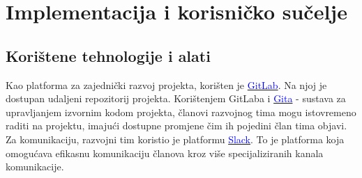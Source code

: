 \chapter{Implementacija i korisničko sučelje} \label{implementacija}
		
		
		\section{Korištene tehnologije i alati}
		
			 
			
        \par{
            Kao platforma za zajednički razvoj projekta, korišten je \href{https://gitlab.com/}{\textcolor{blue}{GitLab}}. Na njoj je dostupan udaljeni repozitorij projekta. Korištenjem GitLaba i \href{https://git-scm.com/}{\textcolor{blue}{Gita}} - sustava za upravljanjem izvornim kodom projekta, članovi razvojnog tima mogu istovremeno raditi na projektu, imajući dostupne promjene čim ih pojedini član tima objavi. Za komunikaciju, razvojni tim koristio je platformu \href{https://slack.com/}{\textcolor{blue}{Slack}}. To je platforma koja omogućava efikasnu komunikaciju članova kroz više specijaliziranih kanala komunikacije.
        }		
        
